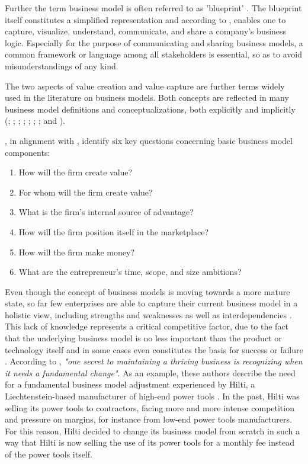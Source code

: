 Further the term business model is often referred to as 'blueprint' . The blueprint itself constitutes a simplified representation and according to \citet[pp. 11-14]{Osterwalder2005}, enables one to capture, visualize, understand, communicate, and share a company's business logic. Especially for the purpose of communicating and sharing business models, a common framework or language among all stakeholders is essential, so as to avoid misunderstandings of any kind.

The two aspects of value creation and value capture are further terms widely used in the literature on business models. Both concepts are reflected in many business model definitions and conceptualizations, both explicitly and implicitly (\citealp[p. 511]{Amit2001}; \citealp[pp. 533-534]{Chesbrough2002}; \citealp[p. 727]{Morris2005}; \citealp[p. 202]{Shafer2005}; \citealp[p. 12]{Chesbrough2007}; \citealp[p. 52]{Johnson2008}; \citealp[p. 14]{Osterwalder2010}; and \citealp[pp. 1019-1020]{Zott2011}). 

\citet[pp. 729-732]{Morris2005}, in alignment with \citet[pp. 49-61]{Drucker1954}, identify six key questions concerning basic business model components:

\begin{enumerate}[parsep=0pt, topsep=0pt, itemsep=0pt]
	\item How will the firm create value?
	\item For whom will the firm create value?
	\item What is the firm's internal source of advantage?
	\item How will the firm position itself in the marketplace?
	\item How will the firm make money?
	\item What are the entrepreneur's time, scope, and size ambitions?
\end{enumerate}

Even though the concept of business models is moving towards a more mature state, so far few enterprises are able to capture their current business model in a holistic view, including strengths and weaknesses as well as interdependencies \citep[p. 52]{Johnson2008}. This lack of knowledge represents a critical competitive factor, due to the fact that the underlying business model is no less important than the product or technology itself and in some cases even constitutes the basis for success or failure . According to \citet[p. 50]{Johnson2008}, \textit{"one secret to maintaining a thriving business is recognizing when it needs a fundamental change"}. As an example, these authors describe the need for a fundamental business model adjustment experienced by Hilti, a Liechtenstein-based manufacturer of high-end power tools \citep[pp. 54-57]{Johnson2008}. In the past, Hilti was selling its power tools to contractors, facing more and more intense competition and pressure on margins, for instance from low-end power tools manufacturers. For this reason, Hilti decided to change its business model from scratch in such a way that Hilti is now selling the use of its power tools for a monthly fee instead of the power tools itself.


